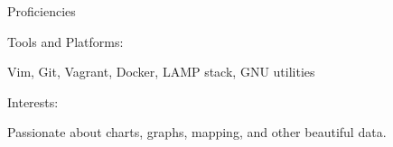 \documentclass[letterpaper,12pt]{article}
\newif\ifrobots
\begin{document}
\begin{paracol}{2}
\begin{res_section}{Proficiencies}
  \begin{res_para}{Tools and Platforms:}%
    \raggedright
    Vim, Git, Vagrant, Docker, LAMP stack, GNU utilities\\
  \end{res_para}
  \begin{res_para}{Interests:}%
    \raggedright
    Passionate about charts, graphs, mapping, and other beautiful data.\\
 \ifrobots

    Continued personal experience working with microcontrollers and EDA (KiCad, Eagle)
 \fi
  \end{res_para}
\end{res_section}

\switchcolumn
  \vspace{6pt}


\end{paracol}
\end{document}
